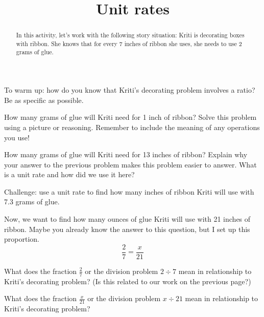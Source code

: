 \documentclass[nooutcomes,noauthor]{ximera}
\title{Unit rates}
\begin{document}
\begin{abstract}
In this activity, let's work with the following story situation: Kriti is decorating boxes with ribbon. She knows that for every 7 inches of ribbon she uses, she needs to use 2 grams of glue. 
\end{abstract}
\maketitle


\begin{problem}
To warm up: how do you know that Kriti's decorating problem involves a ratio? Be as specific as possible.

\end{problem}


\begin{problem}
How many grams of glue will Kriti need for 1 inch of ribbon? Solve this problem using a picture or reasoning. Remember to include the meaning of any operations you use!
\end{problem}


\begin{problem}
How many grams of glue will Kriti need for 13 inches of ribbon? Explain why your answer to the previous problem makes this problem easier to answer. What is a unit rate and how did we use it here?

\end{problem}



\begin{problem}
Challenge: use a unit rate to find how many inches of ribbon Kriti will use with 7.3 grams of glue.
\end{problem}

\newpage


Now, we want to find how many ounces of glue Kriti will use with 21 inches of ribbon. Maybe you already know the answer to this question, but I set up this proportion.
\[
\frac{2}{7} = \frac{x}{21}
\]

\begin{problem}
What does the fraction $\frac{2}{7}$ or the division problem $2 \div 7$ mean in relationship to Kriti's decorating problem? (Is this related to our work on the previous page?)
\end{problem}


\begin{problem}
What does the fraction $\frac{x}{21}$ or the division problem $x \div 21$ mean in relationship to Kriti's decorating problem?
\end{problem}
\end{document}
